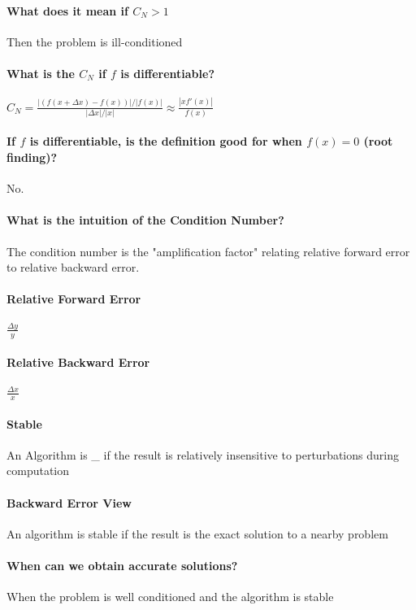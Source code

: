 \documentclass[12pt]{article}
\begin{document}
\paragraph{What does it mean if $C_N > 1$}

Then the problem is ill-conditioned

\paragraph{What is the $C_N$ if $f$ is differentiable?}

$C_N = \frac{|(f(x + \Delta x) - f(x))| / |f(x)|}{|
    \Delta x|/ |x|} \approx \frac{|xf'(x)|}{f(x)}$
    
\paragraph{If $f$ is differentiable, is the definition good for when $f(x)=0$ (root finding)?}

No.

\paragraph{What is the intuition of the Condition Number?}

The condition number is the "amplification factor" relating relative forward error to relative backward error.

\paragraph{Relative Forward Error}

$\frac{\Delta y}{y}$

\paragraph{Relative Backward Error}

$\frac{\Delta x}{x}$

\paragraph{Stable}

An Algorithm is \_ if the result is relatively insensitive to perturbations during computation

\paragraph{Backward Error View}

An algorithm is stable if the result is the exact solution to a nearby problem

\paragraph{When can we obtain accurate solutions?}

When the problem is well conditioned and the algorithm is stable
\end{document}
